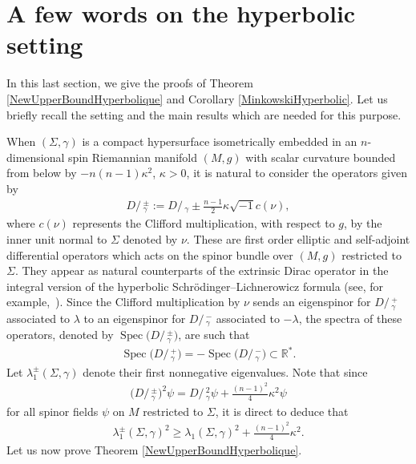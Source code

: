 \documentclass[10pt,a4paper]{amsart}
\numberwithin{equation}{section}
\def\D{D\!\!\!\!/\,}
\begin{document}
\section{A few words on the hyperbolic setting}\label{HyperbolicPart}

In this last section, we give the proofs of Theorem \ref{NewUpperBoundHyperbolique} and Corollary \ref{MinkowskiHyperbolic}. Let us briefly recall the setting and the main results which are needed for this purpose.

When $(\Sigma,\gamma)$ is a compact hypersurface isometrically embedded in an $n$-dimensional spin Riemannian manifold $(M,g)$ with scalar curvature bounded from below by $-n(n-1)\kappa^2$, $\kappa>0$, it is natural to consider the operators given by
\begin{gather*}
\D_\gamma^\pm:=\D_\gamma\pm \frac{n-1}{2}\kappa \sqrt{-1}c(\nu),
\end{gather*}
where $c(\nu)$ represents the Clifford multiplication, with respect to $g$, by the inner unit normal to $\Sigma$ denoted by $\nu$. These are first order elliptic and self-adjoint differential operators which acts on the spinor bundle over $(M,g)$ restricted to $\Sigma$. They appear as natural counterparts of the extrinsic Dirac operator in the integral version of the hyperbolic Schr\"odinger--Lichnerowicz formula (see, for example,~\cite{ChruscielHerzlich,HijaziMontielRaulot3,HijaziMontielRoldan,Kwong1,WangYau0}). Since the Clifford multiplication by $\nu$ sends an eigenspinor for $\D^+_\gamma$ associated to $\lambda$ to an eigenspinor for $\D^-_\gamma$ associated to $-\lambda$, the spectra of these operators, denoted by $\operatorname{Spec}\big(\D^\pm_\gamma\big)$, are such that
\begin{gather*}%
\operatorname{Spec}\big(\D_\gamma^+\big)=-\operatorname{Spec}\big(\D_\gamma^-\big)\subset\mathbb{R}^*.
\end{gather*}
Let $\lambda^\pm_1(\Sigma,\gamma)$ denote their first nonnegative eigenvalues. Note that since
\begin{gather*}
\big(\D_\gamma^\pm\big)^2\psi=\D_\gamma^2\psi+\frac{(n-1)^2}{4}\kappa^2\psi
\end{gather*}
for all spinor fields $\psi$ on $M$ restricted to $\Sigma$, it is direct to deduce that
\begin{gather}\label{SpectreDpm}
\lambda^\pm_1(\Sigma,\gamma)^2\geq \lambda_1(\Sigma,\gamma)^2+\frac{(n-1)^2}{4}\kappa^2.
\end{gather}
Let us now prove Theorem \ref{NewUpperBoundHyperbolique}.
\end{document}
